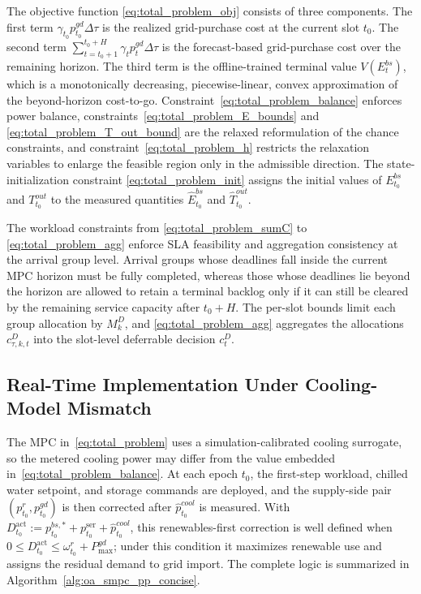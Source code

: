 \documentclass[a4paper,fleqn]{cas-dc}
\theoremstyle{plain}
\theoremstyle{remark}
\theoremstyle{plain}
\begin{document}
The objective function \eqref{eq:total_problem_obj} consists of three components. The first term $\gamma_{t_0}p_{t_0}^{gd}\Delta \tau$ is the realized grid-purchase cost at the current slot $t_0$. The second term $\sum_{t=t_0+1}^{t_0+H}\gamma_t p_t^{gd} \Delta \tau$ is the forecast-based grid-purchase cost over the remaining horizon. The third term is the offline-trained terminal value $V(E_t^{bs})$, which is a monotonically decreasing, piecewise-linear, convex approximation of the beyond-horizon cost-to-go. Constraint~\eqref{eq:total_problem_balance} enforces power balance, constraints~\eqref{eq:total_problem_E_bounds} and \eqref{eq:total_problem_T_out_bound} are the relaxed reformulation of the chance constraints, and constraint~\eqref{eq:total_problem_h} restricts the relaxation variables to enlarge the feasible region only in the admissible direction. The state-initialization constraint \eqref{eq:total_problem_init} assigns the initial values of $E_{t_0}^{bs}$ and $T_{t_0}^{out}$ to the measured quantities $\hat{E}_{t_0}^{bs}$ and $\hat{T}_{t_0}^{out}$.

The workload constraints from \eqref{eq:total_problem_sumC} to \eqref{eq:total_problem_agg} enforce SLA feasibility and aggregation consistency at the arrival group level. Arrival groups whose deadlines fall inside the current MPC horizon must be fully completed, whereas those whose deadlines lie beyond the horizon are allowed to retain a terminal backlog only if it can still be cleared by the remaining service capacity after $t_0+H$. The per-slot bounds limit each group allocation by $M_k^D$, and \eqref{eq:total_problem_agg} aggregates the allocations $c_{\tau,k,t}^D$ into the slot-level deferrable decision $c_t^D$.


\subsection{Real-Time Implementation Under Cooling-Model Mismatch}\label{subsec:rt_impl}

The MPC in~\eqref{eq:total_problem} uses a simulation-calibrated cooling surrogate, so the metered cooling power may differ from the value embedded in~\eqref{eq:total_problem_balance}. At each epoch $t_0$, the first-step workload, chilled water setpoint, and storage commands are deployed, and the supply-side pair $(p_{t_0}^r,p_{t_0}^{gd})$ is then corrected after $\hat p_{t_0}^{cool}$ is measured. With $D_{t_0}^{\mathrm{act}}:=p_{t_0}^{bs,*}+p_{t_0}^{\text{ser}}+\hat{p}_{t_0}^{cool}$, this renewables-first correction is well defined when $0\le D_{t_0}^{\mathrm{act}}\le \omega_{t_0}^r+P_{\max}^{gd}$; under this condition it maximizes renewable use and assigns the residual demand to grid import. The complete logic is summarized in Algorithm~\ref{alg:oa_smpc_pp_concise}.
\end{document}
